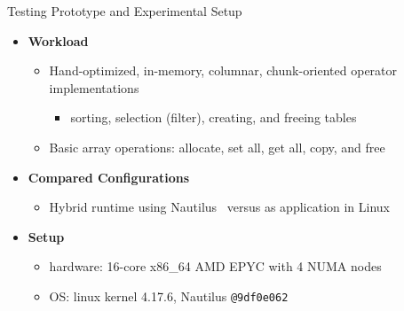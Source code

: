 \begin{block}{Testing Prototype and Experimental Setup}
  \begin{itemize}
    \item \textbf{Workload}
      \begin{itemize}
      \item Hand-optimized, in-memory, columnar, chunk-oriented operator
        implementations
    \begin{itemize}
    \item sorting, selection (filter), creating, and freeing tables
    \end{itemize}
  \item Basic array operations: allocate, set all, get all, copy, and free
  \end{itemize}
   \item \textbf{Compared Configurations}
    \begin{itemize}
    \item Hybrid runtime using Nautilus~\cite{HALE:2015:NAUTILUS} versus as application in Linux 
    \end{itemize}
  \item \textbf{Setup}
    \begin{itemize}
    \item hardware: 16-core x86\_64 AMD EPYC with 4 NUMA nodes
    \item OS: linux kernel 4.17.6, Nautilus \verb+@9df0e062+
    \end{itemize}
  \end{itemize}
\end{block}
